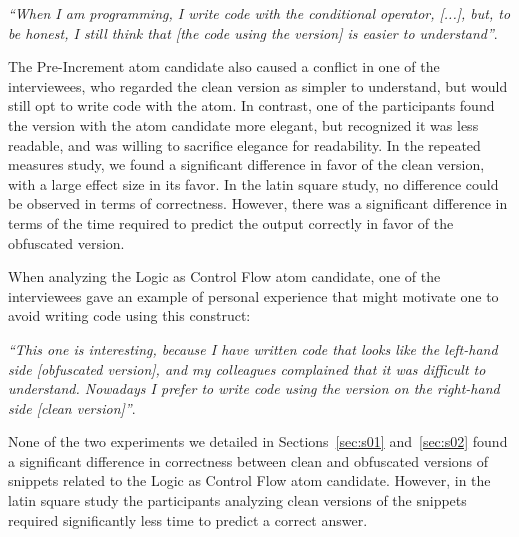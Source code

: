 \begin{mq}
\emph{``When I am programming, I write code with the conditional operator, [...], but, to be honest, I still think that 
[the code using the \rhs version] 
is easier to understand''}.
\end{mq}



The Pre-Increment atom candidate also caused a
conflict in one of the interviewees, who
regarded the clean version as simpler to understand, but would still opt to write
code with the atom. In contrast, %
one of the participants found the version with the atom candidate more elegant, but recognized it was less readable, and was willing to sacrifice elegance for readability. In the repeated measures study, we found a significant difference in favor of the clean version, with a large effect size in its favor. In the latin square study, no difference could be observed in terms of correctness. However, there was a significant difference in terms of the time required to predict the output correctly in favor of the obfuscated version. 

When analyzing the Logic as Control Flow atom candidate, one of the interviewees gave an example of personal experience that might motivate one to avoid writing code using this construct:

\begin{mq}
  \emph{``This one is interesting, because I have written code that looks like the left-hand side [obfuscated version], and my colleagues complained that it was difficult to understand. Nowadays I prefer to write code using the version on the right-hand side [clean version]''}.
\end{mq}
\noindent
None of the two experiments we detailed in Sections~\ref{sec:s01} and~\ref{sec:s02} found a significant difference in correctness between clean and obfuscated versions of snippets related to the Logic as Control Flow atom candidate. However, in the latin square study the participants analyzing clean versions of the snippets required significantly less time to predict a correct answer. 

